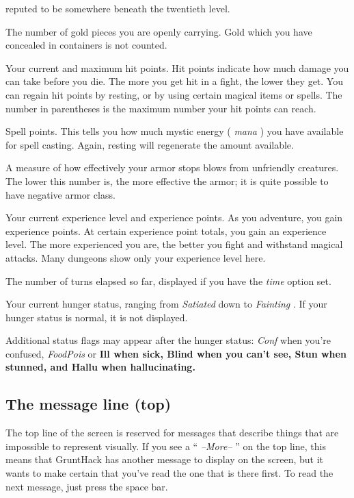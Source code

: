 reputed to be somewhere beneath the twentieth level.
\item[\bb{"Gold  "}]
The number of gold pieces you are openly carrying.  Gold which you have
concealed in containers is not counted.
\item[\bb{Hit Points}]
Your current and maximum hit points.  Hit points indicate how much
damage you can take before you die.  The more you get hit in a fight,
the lower they get.  You can regain hit points by resting, or by using
certain magical items or spells.  The number in parentheses is the maximum
number your hit points can reach.
\item[\bb{Power}]
Spell points.  This tells you how much mystic energy (%
{\it  mana}%
)
you have available for spell casting.  Again, resting will regenerate the
amount available.
\item[\bb{Armor Class}]
A measure of how effectively your armor stops blows from unfriendly
creatures.  The lower this number is, the more effective the armor; it
is quite possible to have negative armor class. 
\item[\bb{Experience}]
Your current experience level and experience points.  As you
adventure, you gain experience points.  At certain experience point
totals, you gain an experience level.  The more experienced you are,
the better you fight and withstand magical attacks.  Many dungeons
show only your experience level here.
\item[\bb{Time}]
The number of turns elapsed so far, displayed if you have the
{\it time}
option set.
\item[\bb{Hunger status}]
Your current hunger status, ranging from %
{\it Satiated}
down to
%
{\it  Fainting}%
.  If your hunger status is normal, it is not displayed.

Additional status flags may appear after the hunger status:  %
{\it Conf}
when you're confused, %
{\it FoodPois}
or %
\bf Ill \rm%
when sick, %
\bf Blind \rm%
when you can't
see, %
\bf Stun \rm%
when stunned, and %
\bf Hallu \rm%
when hallucinating.
\elist
\subsection*{The message line (top)}

The top line of the screen is reserved for messages that describe
things that are impossible to represent visually.  If you see a
``%
{\it  --More--}%
'' on the top line, this means that GruntHack has
another message to display on the screen, but it wants to make certain
that you've read the one that is there first.  To read the next message,
just press the space bar.
